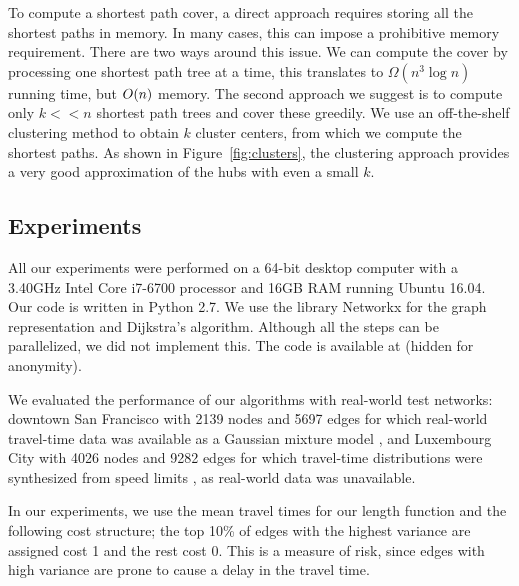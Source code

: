 \vspace{-0.5em}
\begin{remark}
To compute a shortest path cover, a direct approach requires storing all the shortest paths in memory.
In many cases, this can impose a prohibitive memory requirement.
There are two ways around this issue.
We can compute the cover by processing one shortest path tree at a time, this translates to $\Omega(n^3\log n)$ running time, but $O(n)$ memory.
The second approach we suggest is to compute only $k<<n$ shortest path trees and cover these greedily.
We use an off-the-shelf clustering method to obtain $k$ cluster centers, from which we compute the shortest paths. 
As shown in Figure~\ref{fig:clusters}, the clustering approach provides a very good approximation of the hubs with even a small $k$.
\end{remark}

\subsection{Experiments} 
\label{sec:exp}

All our experiments were performed on a 64-bit desktop computer with a 3.40GHz Intel Core i7-6700 processor and 16GB RAM running Ubuntu 16.04.
Our code is written in Python 2.7.
We use the library Networkx for the graph representation and Dijkstra's algorithm.
Although all the steps can be parallelized, we did not implement this.
The code is available at (hidden for anonymity).%

We evaluated the performance of our algorithms with real-world test networks: downtown San Francisco with 2139 nodes and 5697 edges for which real-world travel-time data was available as a Gaussian mixture model \cite{sf_data}, and Luxembourg City with 4026 nodes and 9282 edges for which travel-time distributions were synthesized from speed limits \cite{niknami2016tractable}, as real-world data was unavailable.
 
In our experiments, we use the mean travel times for our length function and the following cost structure; the top 10\% of edges with the highest variance are assigned cost 1 and the rest cost 0.
This is a measure of risk, since edges with high variance are prone to cause a delay in the travel time.


